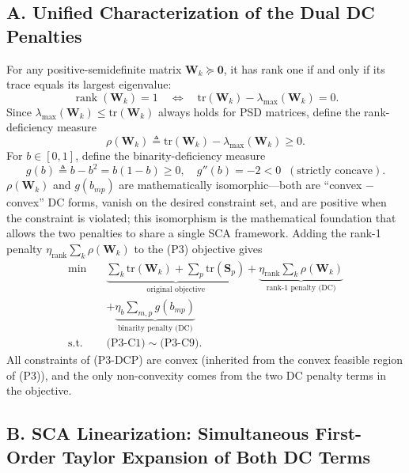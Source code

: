 \documentclass[12pt,a4paper]{article}
\newcommand{\mat}[1]{\mathbf{#1}}
\newcommand{\tr}{\text{tr}}
\DeclareMathOperator{\rank}{rank}
\begin{document}
\subsection*{A. Unified Characterization of the Dual DC Penalties}

For any positive-semidefinite matrix $\mat{W}_k \succeq \mat{0}$, it has rank one if and only if its trace equals its largest eigenvalue:
\begin{equation}\label{eq:rank1-equivalence}
\rank(\mat{W}_k) = 1 \quad \Longleftrightarrow \quad \tr(\mat{W}_k) - \lambda_{\max}(\mat{W}_k) = 0.
\end{equation}
Since $\lambda_{\max}(\mat{W}_k) \leq \tr(\mat{W}_k)$ always holds for PSD matrices, define the rank-deficiency measure
\begin{equation}\label{eq:rho-def}
\rho(\mat{W}_k) \triangleq \tr(\mat{W}_k) - \lambda_{\max}(\mat{W}_k) \geq 0.
\end{equation}
For $b \in [0,1]$, define the binarity-deficiency measure
\begin{equation}\label{eq:g-def}
g(b) \triangleq b - b^2 = b(1-b) \geq 0, \quad g''(b) = -2 < 0 \;\; (\text{strictly concave}).
\end{equation}
$\rho(\mat{W}_k)$ and $g(b_{mp})$ are mathematically isomorphic---both are ``convex $-$ convex'' DC forms, vanish on the desired constraint set, and are positive when the constraint is violated; this isomorphism is the mathematical foundation that allows the two penalties to share a single SCA framework. Adding the rank-1 penalty $\eta_{\text{rank}} \sum_k \rho(\mat{W}_k)$ to the (P3) objective gives
\begin{equation}\label{eq:p3-dcp}
\begin{aligned}
\min \quad &\underbrace{\sum_k \tr(\mat{W}_k) + \sum_p \tr(\mat{S}_p)}_{\text{original objective}}
+ \underbrace{\eta_{\text{rank}} \sum_k \rho(\mat{W}_k)}_{\text{rank-1 penalty (DC)}} \\
&+ \underbrace{\eta_b \sum_{m,p} g(b_{mp})}_{\text{binarity penalty (DC)}} \\
\text{s.t.}\quad &\text{(P3-C1)} \sim \text{(P3-C9)}.
\end{aligned}
\end{equation}
All constraints of (P3-DCP) are convex (inherited from the convex feasible region of (P3)), and the only non-convexity comes from the two DC penalty terms in the objective.

\subsection*{B. SCA Linearization: Simultaneous First-Order Taylor Expansion of Both DC Terms}
\end{document}
